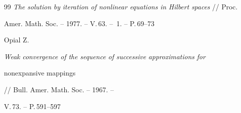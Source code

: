 \begin{thebibliography}{99}
{\em The solution by iteration of nonlinear equations in Hilbert spaces} // Proc. 


Amer. Math. Soc. -- 1977. -- V.\,63. -- \No\,1. -- P.\,69--73








 Opial Z.


{\em Weak convergence of the sequence of successive approximations for 


nonexpansive mappings} // Bull. Amer. Math. Soc. -- 1967. --


V.\,73. -- P.\,591--597








\end{thebibliography}





\vskip 2cm












\label{end}





